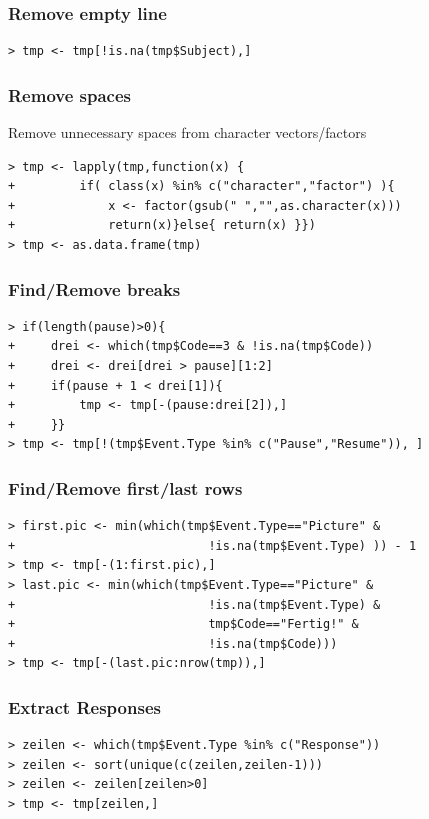 \documentclass[xcolor={table},c]{beamer}
\begin{document}
\begin{frame}[fragile]\frametitle{Remove empty line}
\begin{verbatim}
> tmp <- tmp[!is.na(tmp$Subject),] 
\end{verbatim}
\end{frame}


\begin{frame}[fragile]\frametitle{Remove spaces}
Remove unnecessary spaces from character vectors/factors
\begin{verbatim}
> tmp <- lapply(tmp,function(x) {
+         if( class(x) %in% c("character","factor") ){
+             x <- factor(gsub(" ","",as.character(x)))
+             return(x)}else{ return(x) }})
> tmp <- as.data.frame(tmp)
\end{verbatim}
\end{frame}



\begin{frame}[fragile]\frametitle{Find/Remove breaks}
\begin{verbatim}
> if(length(pause)>0){
+     drei <- which(tmp$Code==3 & !is.na(tmp$Code))
+     drei <- drei[drei > pause][1:2]
+     if(pause + 1 < drei[1]){
+         tmp <- tmp[-(pause:drei[2]),]
+     }}
> tmp <- tmp[!(tmp$Event.Type %in% c("Pause","Resume")), ]
\end{verbatim}
\end{frame}


\begin{frame}[fragile]\frametitle{Find/Remove first/last rows}
\begin{verbatim}
> first.pic <- min(which(tmp$Event.Type=="Picture" & 
+                           !is.na(tmp$Event.Type) )) - 1 
> tmp <- tmp[-(1:first.pic),]
> last.pic <- min(which(tmp$Event.Type=="Picture" & 
+                           !is.na(tmp$Event.Type) &
+                           tmp$Code=="Fertig!" & 
+                           !is.na(tmp$Code)))
> tmp <- tmp[-(last.pic:nrow(tmp)),]
\end{verbatim}
\end{frame}


\begin{frame}[fragile]\frametitle{Extract Responses}
\begin{verbatim}
> zeilen <- which(tmp$Event.Type %in% c("Response"))
> zeilen <- sort(unique(c(zeilen,zeilen-1)))
> zeilen <- zeilen[zeilen>0]
> tmp <- tmp[zeilen,]
\end{verbatim}
\end{frame}
\end{document}

